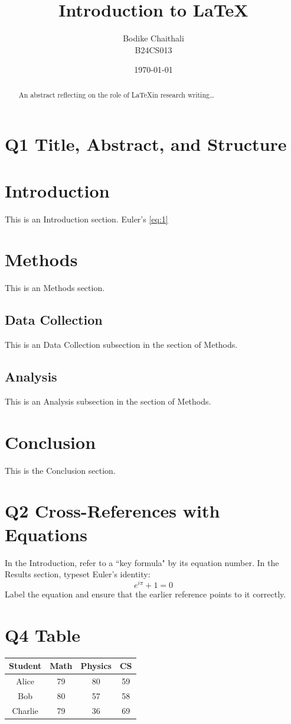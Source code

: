 \documentclass{article}
\title{Introduction to LaTeX}
\author{Bodike Chaithali \\ B24CS013}
\date{\today}
\begin{document}
	\maketitle
	\begin{abstract}
		An abstract reflecting on the role of \LaTeX in research writing\ldots
	\end{abstract}
	\section*{Q1 Title, Abstract, and Structure}
	\section{Introduction}
	This is an Introduction section.
	Euler’s \eqref{eq:1}
	\section{Methods}
	This is an Methods section. 
	\subsection{Data Collection}
	This is an Data Collection subsection in the section of Methods.
	\subsection{Analysis}
	This is an Analysis subsection in the section of Methods.
	\section{Conclusion}
	This is the Conclusion section.
	\section*{Q2 Cross-References with Equations}
	In the Introduction, refer to a ``key formula" by its equation number. In the Results section,
	typeset Euler’s identity:
	\begin{equation}
		\label{eq:1}
		e^{i\pi}+ 1 =0
	\end{equation}
	Label the equation and ensure that the earlier reference points to it correctly.
	\section*{Q4 Table}
	\begin{table}[h]
		\centering
		\begin{tabular}{|c|c|c|c|}
			\hline
			Student & Math & Physics & CS \\ \hline
			Alice & 79 & 80 & 59 \\ \hline
			Bob & 80 & 57 & 58 \\ \hline
			Charlie & 79 & 36 & 69 \\ \hline 
		\end{tabular}
	\end{table}
\end{document}
